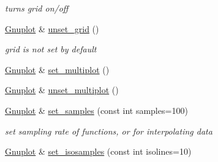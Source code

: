 \begin{DoxyCompactItemize}
\begin{DoxyCompactList}\small\item\em turns grid on/off \end{DoxyCompactList}\item 
\hypertarget{classkukadu_1_1Gnuplot_a58316e0929ce39f1a50aefd528ba835e}{\hyperlink{classkukadu_1_1Gnuplot}{Gnuplot} \& \hyperlink{classkukadu_1_1Gnuplot_a58316e0929ce39f1a50aefd528ba835e}{unset\-\_\-grid} ()}\label{classkukadu_1_1Gnuplot_a58316e0929ce39f1a50aefd528ba835e}

\begin{DoxyCompactList}\small\item\em grid is not set by default \end{DoxyCompactList}\item 
\hyperlink{classkukadu_1_1Gnuplot}{Gnuplot} \& \hyperlink{classkukadu_1_1Gnuplot_aab85e8b17756b471d3c800be4aab9cff}{set\-\_\-multiplot} ()
\item 
\hyperlink{classkukadu_1_1Gnuplot}{Gnuplot} \& \hyperlink{classkukadu_1_1Gnuplot_a91600bc5fa98295f48440bb211ba89db}{unset\-\_\-multiplot} ()
\item 
\hypertarget{classkukadu_1_1Gnuplot_aed34438f8adfdd17b5b529e77eca3dd8}{\hyperlink{classkukadu_1_1Gnuplot}{Gnuplot} \& \hyperlink{classkukadu_1_1Gnuplot_aed34438f8adfdd17b5b529e77eca3dd8}{set\-\_\-samples} (const int samples=100)}\label{classkukadu_1_1Gnuplot_aed34438f8adfdd17b5b529e77eca3dd8}

\begin{DoxyCompactList}\small\item\em set sampling rate of functions, or for interpolating data \end{DoxyCompactList}\item 
\hypertarget{classkukadu_1_1Gnuplot_ae915b506a6ad7667635b1c8f2d41365e}{\hyperlink{classkukadu_1_1Gnuplot}{Gnuplot} \& \hyperlink{classkukadu_1_1Gnuplot_ae915b506a6ad7667635b1c8f2d41365e}{set\-\_\-isosamples} (const int isolines=10)}\label{classkukadu_1_1Gnuplot_ae915b506a6ad7667635b1c8f2d41365e}


\end{DoxyCompactItemize}
